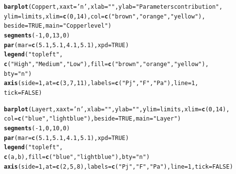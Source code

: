 \documentclass{article}\usepackage[]{graphicx}\usepackage[]{color}
\makeatletter
\newcommand{\hlnum}[1]{\textcolor[rgb]{0.686,0.059,0.569}{#1}}%
\newcommand{\hlstr}[1]{\textcolor[rgb]{0.192,0.494,0.8}{#1}}%
\newcommand{\hlopt}[1]{\textcolor[rgb]{0,0,0}{#1}}%
\newcommand{\hlstd}[1]{\textcolor[rgb]{0.345,0.345,0.345}{#1}}%
\newcommand{\hlkwc}[1]{\textcolor[rgb]{0.333,0.667,0.333}{#1}}%
\newcommand{\hlkwd}[1]{\textcolor[rgb]{0.737,0.353,0.396}{\textbf{#1}}}%
\newenvironment{kframe}{%
 \def\at@end@of@kframe{}%
 \ifinner\ifhmode%
  \def\at@end@of@kframe{\end{minipage}}%
  \begin{minipage}{\columnwidth}%
 \fi\fi%
 \def\FrameCommand##1{\hskip\@totalleftmargin \hskip-\fboxsep
 \colorbox{shadecolor}{##1}\hskip-\fboxsep
     \hskip-\linewidth \hskip-\@totalleftmargin \hskip\columnwidth}%
 \MakeFramed {\advance\hsize-\width
   \@totalleftmargin\z@ \linewidth\hsize
   \@setminipage}}%
 {\par\unskip\endMakeFramed%
 \at@end@of@kframe}
\newenvironment{knitrout}{}{} %
\makeatother
\begin{document}
\begin{knitrout}
\begin{kframe}
\begin{alltt}
\hlkwd{barplot}\hlstd{(Coppert,}\hlkwc{xaxt}\hlstd{=}\hlstr{'n'}\hlstd{,} \hlkwc{xlab}\hlstd{=}\hlstr{""}\hlstd{,} \hlkwc{ylab}\hlstd{=}\hlstr{"Parameters contribution"}\hlstd{,}
        \hlkwc{ylim}\hlstd{=limits,} \hlkwc{xlim}\hlstd{=}\hlkwd{c}\hlstd{(}\hlnum{0}\hlstd{,}\hlnum{14}\hlstd{),} \hlkwc{col}\hlstd{=}\hlkwd{c}\hlstd{(}\hlstr{"brown"}\hlstd{,}\hlstr{"orange"}\hlstd{,} \hlstr{"yellow"}\hlstd{),}
        \hlkwc{beside}\hlstd{=}\hlnum{TRUE}\hlstd{,} \hlkwc{main}\hlstd{=}\hlstr{"Copper level"}\hlstd{)}
\hlkwd{segments}\hlstd{(}\hlopt{-}\hlnum{1}\hlstd{,}\hlnum{0}\hlstd{,} \hlnum{13}\hlstd{,}\hlnum{0}\hlstd{)}
\hlkwd{par}\hlstd{(}\hlkwc{mar}\hlstd{=}\hlkwd{c}\hlstd{(}\hlnum{5.1}\hlstd{,} \hlnum{5.1}\hlstd{,} \hlnum{4.1}\hlstd{,} \hlnum{5.1}\hlstd{),} \hlkwc{xpd}\hlstd{=}\hlnum{TRUE}\hlstd{)}
\hlkwd{legend}\hlstd{(}\hlstr{"topleft"}\hlstd{,}
     \hlkwd{c}\hlstd{(}\hlstr{"High"}\hlstd{,} \hlstr{"Medium"}\hlstd{,} \hlstr{"Low"}\hlstd{),} \hlkwc{fill}\hlstd{=}\hlkwd{c}\hlstd{(}\hlstr{"brown"}\hlstd{,}\hlstr{"orange"}\hlstd{,} \hlstr{"yellow"}\hlstd{),}
     \hlkwc{bty}\hlstd{=}\hlstr{"n"}\hlstd{)}
\hlkwd{axis}\hlstd{(}\hlkwc{side}\hlstd{=}\hlnum{1}\hlstd{,} \hlkwc{at}\hlstd{=}\hlkwd{c}\hlstd{(}\hlnum{3}\hlstd{,}\hlnum{7}\hlstd{,}\hlnum{11}\hlstd{),} \hlkwc{labels}\hlstd{=}\hlkwd{c}\hlstd{(} \hlstr{"Pj"}\hlstd{,} \hlstr{"F"}\hlstd{,} \hlstr{"Pa"}\hlstd{),} \hlkwc{line}\hlstd{=}\hlnum{1}\hlstd{,}
     \hlkwc{tick}\hlstd{=}\hlnum{FALSE}\hlstd{)}

\hlkwd{barplot}\hlstd{(Layert,}\hlkwc{xaxt}\hlstd{=}\hlstr{'n'}\hlstd{,} \hlkwc{xlab}\hlstd{=}\hlstr{""}\hlstd{,} \hlkwc{ylab}\hlstd{=}\hlstr{""}\hlstd{,} \hlkwc{ylim}\hlstd{=limits,} \hlkwc{xlim}\hlstd{=}\hlkwd{c}\hlstd{(}\hlnum{0}\hlstd{,}\hlnum{14}\hlstd{),}
        \hlkwc{col}\hlstd{=}\hlkwd{c}\hlstd{(}\hlstr{"blue"}\hlstd{,}\hlstr{"lightblue"}\hlstd{),} \hlkwc{beside}\hlstd{=}\hlnum{TRUE}\hlstd{,} \hlkwc{main}\hlstd{=}\hlstr{"Layer"}\hlstd{)}
\hlkwd{segments}\hlstd{(}\hlopt{-}\hlnum{1}\hlstd{,}\hlnum{0}\hlstd{,} \hlnum{10}\hlstd{,}\hlnum{0}\hlstd{)}
\hlkwd{par}\hlstd{(}\hlkwc{mar}\hlstd{=}\hlkwd{c}\hlstd{(}\hlnum{5.1}\hlstd{,} \hlnum{5.1}\hlstd{,} \hlnum{4.1}\hlstd{,} \hlnum{5.1}\hlstd{),} \hlkwc{xpd}\hlstd{=}\hlnum{TRUE}\hlstd{)}
\hlkwd{legend}\hlstd{(}\hlstr{"topleft"}\hlstd{,}
     \hlkwd{c}\hlstd{(a,b),} \hlkwc{fill}\hlstd{=}\hlkwd{c}\hlstd{(}\hlstr{"blue"}\hlstd{,}\hlstr{"lightblue"}\hlstd{),} \hlkwc{bty}\hlstd{=}\hlstr{"n"}\hlstd{)}
\hlkwd{axis}\hlstd{(}\hlkwc{side}\hlstd{=}\hlnum{1}\hlstd{,} \hlkwc{at}\hlstd{=}\hlkwd{c}\hlstd{(}\hlnum{2}\hlstd{,}\hlnum{5}\hlstd{,}\hlnum{8}\hlstd{),} \hlkwc{labels}\hlstd{=}\hlkwd{c}\hlstd{(} \hlstr{"Pj"}\hlstd{,} \hlstr{"F"}\hlstd{,} \hlstr{"Pa"}\hlstd{),} \hlkwc{line}\hlstd{=}\hlnum{1}\hlstd{,} \hlkwc{tick}\hlstd{=}\hlnum{FALSE}\hlstd{)}




\end{alltt}
\end{kframe}
\end{knitrout}
\end{document}
